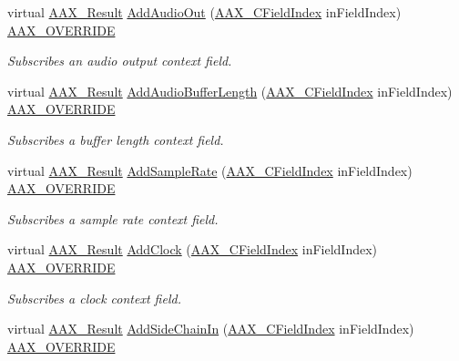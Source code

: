 \begin{DoxyCompactItemize}
virtual \hyperlink{a00149_a4d8f69a697df7f70c3a8e9b8ee130d2f}{A\+A\+X\+\_\+\+Result} \hyperlink{a00131_a7d3db9599a73931d5c9c75b414dcb260}{Add\+Audio\+Out} (\hyperlink{a00149_ae807f8986143820cfb5d6da32165c9c7}{A\+A\+X\+\_\+\+C\+Field\+Index} in\+Field\+Index) \hyperlink{a00149_ac2f24a5172689ae684344abdcce55463}{A\+A\+X\+\_\+\+O\+V\+E\+R\+R\+I\+D\+E}
\begin{DoxyCompactList}\small\item\em Subscribes an audio output context field. \end{DoxyCompactList}\item 
virtual \hyperlink{a00149_a4d8f69a697df7f70c3a8e9b8ee130d2f}{A\+A\+X\+\_\+\+Result} \hyperlink{a00131_ae957a325af68c616c259ebb50613ac26}{Add\+Audio\+Buffer\+Length} (\hyperlink{a00149_ae807f8986143820cfb5d6da32165c9c7}{A\+A\+X\+\_\+\+C\+Field\+Index} in\+Field\+Index) \hyperlink{a00149_ac2f24a5172689ae684344abdcce55463}{A\+A\+X\+\_\+\+O\+V\+E\+R\+R\+I\+D\+E}
\begin{DoxyCompactList}\small\item\em Subscribes a buffer length context field. \end{DoxyCompactList}\item 
virtual \hyperlink{a00149_a4d8f69a697df7f70c3a8e9b8ee130d2f}{A\+A\+X\+\_\+\+Result} \hyperlink{a00131_ab0ba6f002c60124ca32fc240b17e1b1a}{Add\+Sample\+Rate} (\hyperlink{a00149_ae807f8986143820cfb5d6da32165c9c7}{A\+A\+X\+\_\+\+C\+Field\+Index} in\+Field\+Index) \hyperlink{a00149_ac2f24a5172689ae684344abdcce55463}{A\+A\+X\+\_\+\+O\+V\+E\+R\+R\+I\+D\+E}
\begin{DoxyCompactList}\small\item\em Subscribes a sample rate context field. \end{DoxyCompactList}\item 
virtual \hyperlink{a00149_a4d8f69a697df7f70c3a8e9b8ee130d2f}{A\+A\+X\+\_\+\+Result} \hyperlink{a00131_a8483d317cf185631d3c1de34fed02554}{Add\+Clock} (\hyperlink{a00149_ae807f8986143820cfb5d6da32165c9c7}{A\+A\+X\+\_\+\+C\+Field\+Index} in\+Field\+Index) \hyperlink{a00149_ac2f24a5172689ae684344abdcce55463}{A\+A\+X\+\_\+\+O\+V\+E\+R\+R\+I\+D\+E}
\begin{DoxyCompactList}\small\item\em Subscribes a clock context field. \end{DoxyCompactList}\item 
virtual \hyperlink{a00149_a4d8f69a697df7f70c3a8e9b8ee130d2f}{A\+A\+X\+\_\+\+Result} \hyperlink{a00131_aab32b4f61617ed8450dffc4c1ff0ad9e}{Add\+Side\+Chain\+In} (\hyperlink{a00149_ae807f8986143820cfb5d6da32165c9c7}{A\+A\+X\+\_\+\+C\+Field\+Index} in\+Field\+Index) \hyperlink{a00149_ac2f24a5172689ae684344abdcce55463}{A\+A\+X\+\_\+\+O\+V\+E\+R\+R\+I\+D\+E}

\end{DoxyCompactItemize}
